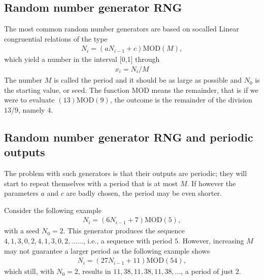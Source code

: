 \documentclass[letterpaper,10pt,english]{sphinxmanual}
\begin{document}
\subsection{Random number generator RNG}
\label{\detokenize{chapter2:random-number-generator-rng}}
The most common random number generators are based on so\sphinxhyphen{}called
Linear congruential relations of the type
\begin{equation*}
\begin{split}
N_i=(aN_{i-1}+c) \mathrm{MOD} (M),
\end{split}
\end{equation*}
which yield a number in the interval {[}0,1{]} through
\begin{equation*}
\begin{split}
x_i=N_i/M
\end{split}
\end{equation*}
The number
\(M\) is called the period and it should be as large as possible
and
\(N_0\) is the starting value, or seed. The function \(\mathrm{MOD}\) means the remainder,
that is if we were to evaluate \((13)\mathrm{MOD}(9)\), the outcome is the remainder
of the division \(13/9\), namely \(4\).


\subsection{Random number generator RNG and periodic outputs}
\label{\detokenize{chapter2:random-number-generator-rng-and-periodic-outputs}}
The problem with such generators is that their outputs are periodic;
they
will start to repeat themselves with a period that is at most \(M\). If however
the parameters \(a\) and \(c\) are badly chosen, the period may be even shorter.

Consider the following example
\begin{equation*}
\begin{split}
N_i=(6N_{i-1}+7) \mathrm{MOD} (5),
\end{split}
\end{equation*}
with a seed \(N_0=2\). This generator produces the sequence
\(4,1,3,0,2,4,1,3,0,2,...\dots\), i.e., a sequence with period \(5\).
However, increasing \(M\) may not guarantee a larger period as the following
example shows
\begin{equation*}
\begin{split}
N_i=(27N_{i-1}+11) \mathrm{MOD} (54),
\end{split}
\end{equation*}
which still, with \(N_0=2\), results in \(11,38,11,38,11,38,\dots\), a period of
just \(2\).
\end{document}

